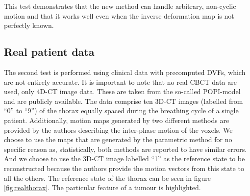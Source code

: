This test demonstrates that the new method can handle arbitrary, non-cyclic motion and that it works well even when the inverse deformation map is not perfectly known.



\subsection{Real patient data}

The second test is performed using clinical data with precomputed DVFs, which are not entirely accurate.  It is important to note that no real CBCT data are used, only 4D-CT image data.  These are taken from the so-called POPI-model\cite{vandemeulebroucke2007popi} and are publicly available\cite{popi-modelweb}.  The data comprise ten 3D-CT images (labelled from ``0'' to ``9'') of the thorax equally spaced during the breathing cycle of a single patient.  Additionally, motion maps generated by two different methods are provided by the authors describing the inter-phase motion of the voxels.  We choose to use the maps that are generated by the parametric method for no specific reason as, statistically, both methods are reported to have similar errors.  And we choose to use the 3D-CT image labelled ``1'' as the reference state to be reconstructed because the authors provide the motion vectors from this state to all the others.  The reference state of the thorax can be seen in figure \ref{fig:realthorax}.  The particular feature of a tumour is highlighted.




